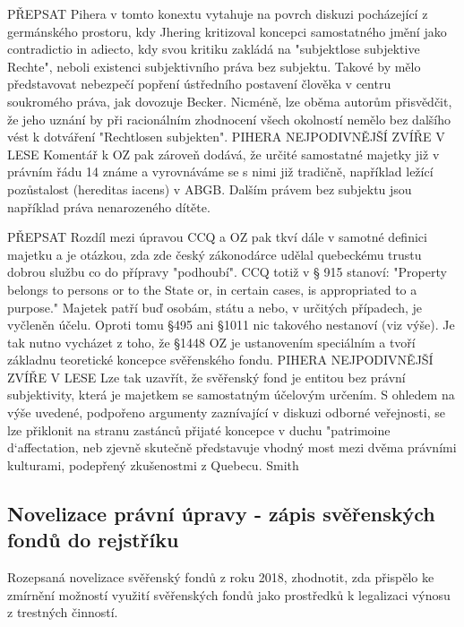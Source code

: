 \documentclass{article}
\begin{document}
PŘEPSAT
Pihera v tomto konextu vytahuje na povrch diskuzi pocházející z germánského prostoru, kdy Jhering kritizoval koncepci samostatného jmění jako contradictio in adiecto, kdy svou kritiku zakládá na "subjektlose subjektive Rechte", neboli existenci subjektivního práva bez subjektu. Takové by mělo představovat nebezpečí popření ústředního postavení člověka v centru soukromého práva, jak dovozuje Becker. Nicméně, lze oběma autorům přisvědčit, že jeho uznání by při racionálním zhodnocení všech okolností nemělo bez dalšího vést k dotváření "Rechtlosen subjekten". PIHERA NEJPODIVNĚJŠÍ ZVÍŘE V LESE Komentář k OZ pak zároveň dodává, že určité samostatné majetky již v právním řádu 14 známe a vyrovnáváme se s nimi již tradičně, například ležící pozůstalost (hereditas iacens) v ABGB. Dalším právem bez subjektu jsou například práva nenarozeného dítěte.

PŘEPSAT
Rozdíl mezi úpravou CCQ a OZ pak tkví dále v samotné definici majetku a je otázkou, zda zde český zákonodárce udělal quebeckému trustu dobrou službu co do přípravy "podhoubí". CCQ totiž v § 915 stanoví: "Property belongs to persons or to the State or, in certain cases, is appropriated to a purpose." Majetek patří buď osobám, státu a nebo, v určitých případech, je vyčleněn účelu. Oproti tomu §495 ani §1011 nic takového nestanoví (viz výše). Je tak nutno vycházet z toho, že §1448 OZ je ustanovením speciálním a tvoří základnu teoretické koncepce svěřenského fondu. PIHERA NEJPODIVNĚJŠÍ ZVÍŘE V LESE Lze tak uzavřít, že svěřenský fond je entitou bez právní subjektivity, která je majetkem se samostatným účelovým určením. S ohledem na výše uvedené, podpořeno argumenty zaznívající v diskuzi odborné veřejnosti, se lze přiklonit na stranu zastánců přijaté koncepce v duchu "patrimoine d`affectation, neb zjevně skutečně představuje vhodný most mezi dvěma právními kulturami, podepřený zkušenostmi z Quebecu. Smith

\subsection{Novelizace právní úpravy - zápis svěřenských fondů do rejstříku}


Rozepsaná novelizace svěřenský fondů z roku 2018, zhodnotit, zda přispělo ke zmírnění možností využití svěřenských fondů jako prostředků k legalizaci výnosu z trestných činností.\\
\end{document}
